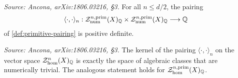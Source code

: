 \begin{conjecture}
  \label{conj:hodge-type}
  \textit{Source: Ancona, arXiv:1806.03216, §3.}
  For all \(n \leq d/2\), the pairing
  \[\langle \cdot, \cdot \rangle_{n} :
    \mathcal{Z}^{n,\mathrm{prim}}_{\mathrm{num}}(X)_{\mathbb{Q}} \times
    \mathcal{Z}^{n,\mathrm{prim}}_{\mathrm{num}}(X)_{\mathbb{Q}} \longrightarrow \mathbb{Q}\]
  of \cref{def:primitive-pairing} is positive definite.
\end{conjecture}

\begin{proposition}
  \label{prop:ker-pairing}
  \textit{Source: Ancona, arXiv:1806.03216, §3.}
  The kernel of the pairing \(\langle \cdot, \cdot \rangle_{n}\) on the vector
  space \(\mathcal{Z}_{\hom}^{n}(X)_{\mathbb{Q}}\) is exactly the space of algebraic
  classes that are numerically trivial. The analogous statement holds for
  \(\mathcal{Z}_{\hom}^{n,\mathrm{prim}}(X)_{\mathbb{Q}}\).
\end{proposition}


